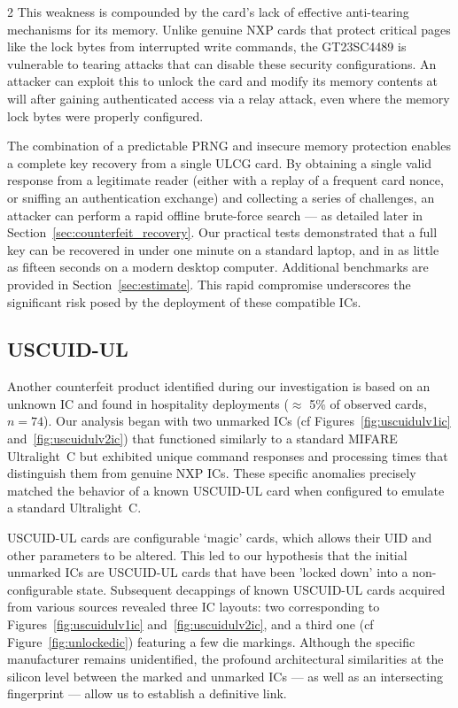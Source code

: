 \documentclass[10pt,letterpaper]{article}
\begin{document}
\begin{multicols}{2}
This weakness is compounded by the card's lack of effective anti-tearing mechanisms for its memory. Unlike genuine NXP cards that protect critical pages like the lock bytes from interrupted write commands, the GT23SC4489 is vulnerable to tearing attacks that can disable these security configurations. An attacker can exploit this to unlock the card and modify its memory contents at will after gaining authenticated access via a relay attack, even where the memory lock bytes were properly configured.

The combination of a predictable PRNG and insecure memory protection enables a complete key recovery from a single ULCG card. By obtaining a single valid response from a legitimate reader (either with a replay of a frequent card nonce, or sniffing an authentication exchange) and collecting a series of challenges, an attacker can perform a rapid offline brute-force search --- as detailed later in Section~\ref{sec:counterfeit_recovery}. Our practical tests demonstrated that a full key can be recovered in under one minute on a standard laptop, and in as little as fifteen seconds on a modern desktop computer. Additional benchmarks are provided in Section~\ref{sec:estimate}. This rapid compromise underscores the significant risk posed by the deployment of these compatible ICs.

\subsection{USCUID-UL}
\label{sec:uscuidul}
Another counterfeit product identified during our investigation is based on an unknown IC and found in hospitality deployments ($\approx$ 5\% of observed cards, $n=74$). Our analysis began with two unmarked ICs (cf Figures~\ref{fig:uscuidulv1ic} and~\ref{fig:uscuidulv2ic}) that functioned similarly to a standard MIFARE Ultralight~C but exhibited unique command responses and processing times that distinguish them from genuine NXP ICs. These specific anomalies precisely matched the behavior of a known USCUID-UL card when configured to emulate a standard Ultralight~C.

USCUID-UL cards are configurable `magic' cards, which allows their UID and other parameters to be altered. This led to our hypothesis that the initial unmarked ICs are USCUID-UL cards that have been 'locked down' into a non-configurable state. Subsequent decappings of known USCUID-UL cards acquired from various sources revealed three IC layouts: two corresponding to Figures~\ref{fig:uscuidulv1ic} and~\ref{fig:uscuidulv2ic}, and a third one (cf Figure~\ref{fig:unlockedic}) featuring a few die markings. Although the specific manufacturer remains unidentified, the profound architectural similarities at the silicon level between the marked and unmarked ICs --- as well as an intersecting fingerprint --- allow us to establish a definitive link.


\end{multicols}
\end{document}
